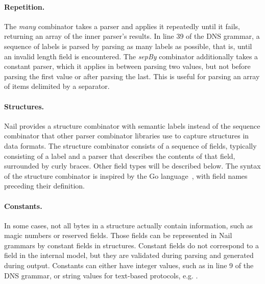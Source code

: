 \paragraph{Repetition.}

The \emph{many} combinator takes a parser and applies it repeatedly
until it fails, returning an array of the inner parser's results. In line 39 of the DNS grammar, a
sequence of labels is parsed by parsing as many labels as possible, that is, until an invalid length
field is encountered.
The \emph{sepBy} combinator
additionally takes a constant parser, which it applies in between parsing
two values, but not before parsing the first value or after parsing the
last.  This is useful for parsing an array of items delimited by a separator.

\paragraph{Structures.}

Nail provides a structure combinator with semantic labels instead of the sequence combinator that
other parser combinator libraries use to capture structures in data formats. 
The structure combinator consists of a sequence of fields, typically consisting of a label and a
parser that describes the contents of that field, surrounded by curly braces. Other field types will be described below.
 The syntax of the structure combinator is inspired by the Go language~\cite{golang}, with field
 names preceding their definition.



\paragraph{Constants.}
In some cases, not all bytes in a structure actually contain information, such as magic numbers or
reserved fields. Those fields can be represented in Nail grammars by constant fields in structures.
Constant fields do not correspond to a field in the internal model, but they are validated during
parsing and generated during output.  Constants can either have integer values, such as
in line 9 of the DNS grammar, or string values for text-based protocols, e.g. .


